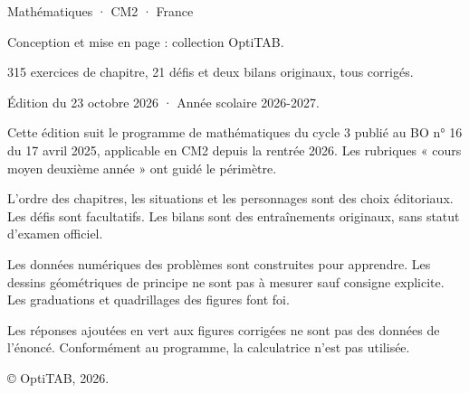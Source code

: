 \thispagestyle{empty}\vspace*{\fill}
\begin{minipage}{128mm}\fontsize{9}{13}\selectfont\color{otMuted}
{\otSemi\color{otInk}Mathématiques · CM2 · France}\par\medskip
Conception et mise en page : collection OptiTAB.\par
315 exercices de chapitre, 21 défis et deux bilans originaux, tous corrigés.\par
Édition du 23 octobre 2026 · Année scolaire 2026-2027.\par\bigskip
Cette édition suit le programme de mathématiques du cycle 3 publié au
BO n° 16 du 17 avril 2025, applicable en CM2 depuis la rentrée 2026.
Les rubriques « cours moyen deuxième année » ont guidé le périmètre.\par\bigskip
L’ordre des chapitres, les situations et les personnages sont des choix
éditoriaux. Les défis sont facultatifs. Les bilans sont des entraînements
originaux, sans statut d’examen officiel.\par\bigskip
Les données numériques des problèmes sont construites pour apprendre.
Les dessins géométriques de principe ne sont pas à mesurer sauf consigne
explicite. Les graduations et quadrillages des figures font foi.\par\bigskip
Les réponses ajoutées en vert aux figures corrigées ne sont pas des données
de l’énoncé. Conformément au programme, la calculatrice n’est pas utilisée.\par\bigskip
© OptiTAB, 2026.\par\otSite
\end{minipage}\clearpage
